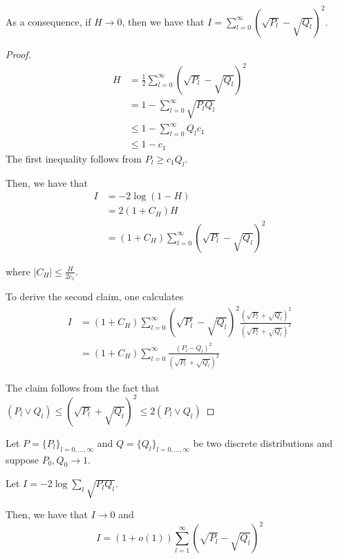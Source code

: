 \documentclass{article}
\begin{document}
As a consequence, if $H \rightarrow 0$, then we have that $I = \sum_{l=0}^\infty (\sqrt{P_l} - \sqrt{Q_l})^2$. 

\begin{proof}

\begin{align*}
H &= \frac{1}{2} \sum_{l=0}^\infty (\sqrt{P_l} - \sqrt{Q_l})^2 \\
 &= 1 - \sum_{l=0}^\infty \sqrt{P_l Q_l} \\
 &\leq 1 - \sum_{l=0}^\infty Q_l c_1 \\
 &\leq 1 - c_1
\end{align*}
The first inequality follows from $P_l \geq c_1 Q_l$. 

Then, we have that
\begin{align*}
I &= - 2 \log (1 - H) \\
  &= 2 (1 + C_H) H \\
  &= (1 + C_H) \sum_{l=0}^\infty (\sqrt{P_l} - \sqrt{Q_l})^2 
\end{align*}

where $|C_H| \leq \frac{H}{2c_1}$. 

To derive the second claim, one calculates
\begin{align*}
I &= (1 + C_H) \sum_{l=0}^\infty (\sqrt{P_l} - \sqrt{Q_l})^2 \frac{(\sqrt{P_l} + \sqrt{Q_l})^2}{(\sqrt{P_l} + \sqrt{Q_l})^2} \\
  &= (1 + C_H) \sum_{l=0}^\infty \frac{(P_l - Q_l)^2}{(\sqrt{P_l} + \sqrt{Q_l})^2}
\end{align*}

The claim follows from the fact that $(P_l \vee Q_l) \leq (\sqrt{P_l} + \sqrt{Q_l})^2 \leq 2 (P_l \vee Q_l)$

\end{proof}


\begin{lemma}
\label{lem:simplify_renyi}
Let $P = \{ P_l \}_{l = 0,..., \infty}$ and $Q = \{ Q_l \}_{l=0,...,\infty}$ be two discrete distributions and suppose $P_0, Q_0 \rightarrow 1$. 

Let $I = - 2 \log \sum_l \sqrt{ P_l Q_l}$.

Then, we have that $I \rightarrow 0$ and 
\[
I = (1 + o(1)) \sum_{l = 1}^\infty (\sqrt{P_l} - \sqrt{Q_l})^2 
\]

\end{lemma}
\end{document}
